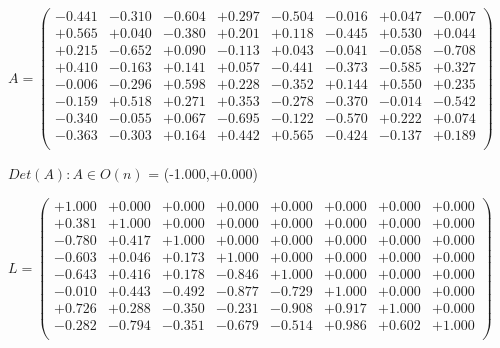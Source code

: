 \documentclass[9pt]{article}
\theoremstyle{plain}
\theoremstyle{definition}
\theoremstyle{remark}
\numberwithin{equation}{section}
\begin{document}
$A = \left(
\begin{array}{
cccccccc}
-0.441 & -0.310 & -0.604 & +0.297 & -0.504 & -0.016 & +0.047 & -0.007 \\
+0.565 & +0.040 & -0.380 & +0.201 & +0.118 & -0.445 & +0.530 & +0.044 \\
+0.215 & -0.652 & +0.090 & -0.113 & +0.043 & -0.041 & -0.058 & -0.708 \\
+0.410 & -0.163 & +0.141 & +0.057 & -0.441 & -0.373 & -0.585 & +0.327 \\
-0.006 & -0.296 & +0.598 & +0.228 & -0.352 & +0.144 & +0.550 & +0.235 \\
-0.159 & +0.518 & +0.271 & +0.353 & -0.278 & -0.370 & -0.014 & -0.542 \\
-0.340 & -0.055 & +0.067 & -0.695 & -0.122 & -0.570 & +0.222 & +0.074 \\
-0.363 & -0.303 & +0.164 & +0.442 & +0.565 & -0.424 & -0.137 & +0.189 \\
\end{array}
\right)$ \newline 

$Det(A) :   A \in O(n)$ = (-1.000,+0.000)

$L = \left(
\begin{array}{
cccccccc}
+1.000 & +0.000 & +0.000 & +0.000 & +0.000 & +0.000 & +0.000 & +0.000 \\
+0.381 & +1.000 & +0.000 & +0.000 & +0.000 & +0.000 & +0.000 & +0.000 \\
-0.780 & +0.417 & +1.000 & +0.000 & +0.000 & +0.000 & +0.000 & +0.000 \\
-0.603 & +0.046 & +0.173 & +1.000 & +0.000 & +0.000 & +0.000 & +0.000 \\
-0.643 & +0.416 & +0.178 & -0.846 & +1.000 & +0.000 & +0.000 & +0.000 \\
-0.010 & +0.443 & -0.492 & -0.877 & -0.729 & +1.000 & +0.000 & +0.000 \\
+0.726 & +0.288 & -0.350 & -0.231 & -0.908 & +0.917 & +1.000 & +0.000 \\
-0.282 & -0.794 & -0.351 & -0.679 & -0.514 & +0.986 & +0.602 & +1.000 \\
\end{array}
\right)$ \newline 
\end{document}
